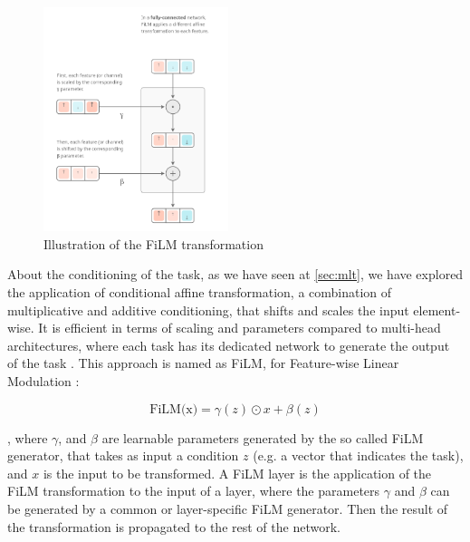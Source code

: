 \documentclass[12pt, a4paper]{article}
\begin{document}




\begin{figure}
  \begin{center}
    \includegraphics[width=0.48\textwidth]{film_layers.png}
  \end{center}
  \caption{Illustration of the FiLM transformation \cite{dumoulin2018feature-wise}}
\end{figure}

About the conditioning of the task, as we have seen at \cref{sec:mlt}, we have explored the application of conditional affine transformation, a combination of multiplicative and additive conditioning, that shifts and scales the input element-wise. It is efficient in terms of scaling and parameters compared to multi-head architectures, where each task has its dedicated network to generate the output of the task . This approach is named as FiLM, for Feature-wise Linear Modulation \cite{dumoulin2018feature-wise, perez2018film}:

\[ \text{FiLM(x)} = \gamma (z) \odot x + \beta (z) \]

, where $\gamma$, and $\beta$ are learnable parameters generated by the so called FiLM generator, that takes as input a condition $z$ (e.g. a vector that indicates the task), and $x$ is the input to be transformed. 
A FiLM layer is the application of the FiLM transformation to the input of a layer, where the parameters $\gamma$ and $\beta$ can be generated by a common or layer-specific FiLM generator.   Then the result of the transformation is propagated to the rest of the network.
\end{document}
